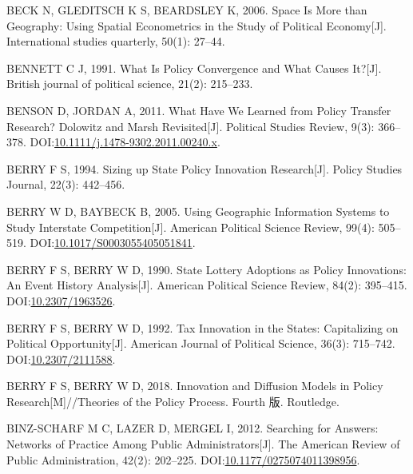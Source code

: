 \documentclass[
  12pt,
]{ctexart}
\newlength{\cslhangindent}
\newlength{\cslentryspacingunit} %
\newenvironment{CSLReferences}[2] %
 {%
  \setlength{\parindent}{0pt}
  \ifodd #1
  \let\oldpar\par
  \def\par{\hangindent=\cslhangindent\oldpar}
  \fi
  \setlength{\parskip}{#2\cslentryspacingunit}
 }%
 {}
\begin{document}
\begin{CSLReferences}{1}{0}
\leavevmode{}%
BECK N, GLEDITSCH K S, BEARDSLEY K, 2006. Space Is More than Geography: {Using} Spatial Econometrics in the Study of Political Economy{[}J{]}. International studies quarterly, 50(1): 27--44.

\leavevmode{}%
BENNETT C J, 1991. What Is Policy Convergence and What Causes It?{[}J{]}. British journal of political science, 21(2): 215--233.

\leavevmode{}%
BENSON D, JORDAN A, 2011. What Have We {Learned} from {Policy Transfer Research}? {Dolowitz} and {Marsh Revisited}{[}J{]}. Political Studies Review, 9(3): 366--378. DOI:\href{https://doi.org/10.1111/j.1478-9302.2011.00240.x}{10.1111/j.1478-9302.2011.00240.x}.

\leavevmode{}%
BERRY F S, 1994. Sizing up {State Policy Innovation Research}{[}J{]}. Policy Studies Journal, 22(3): 442--456.

\leavevmode{}%
BERRY W D, BAYBECK B, 2005. Using {Geographic Information Systems} to {Study Interstate Competition}{[}J{]}. American Political Science Review, 99(4): 505--519. DOI:\href{https://doi.org/10.1017/S0003055405051841}{10.1017/S0003055405051841}.

\leavevmode{}%
BERRY F S, BERRY W D, 1990. State {Lottery Adoptions} as {Policy Innovations}: {An Event History Analysis}{[}J{]}. American Political Science Review, 84(2): 395--415. DOI:\href{https://doi.org/10.2307/1963526}{10.2307/1963526}.

\leavevmode{}%
BERRY F S, BERRY W D, 1992. Tax {Innovation} in the {States}: {Capitalizing} on {Political Opportunity}{[}J{]}. American Journal of Political Science, 36(3): 715--742. DOI:\href{https://doi.org/10.2307/2111588}{10.2307/2111588}.

\leavevmode{}%
BERRY F S, BERRY W D, 2018. Innovation and {Diffusion Models} in {Policy Research}{[}M{]}//Theories of the {Policy Process}. Fourth 版. {Routledge}.

\leavevmode{}%
BINZ-SCHARF M C, LAZER D, MERGEL I, 2012. Searching for {Answers}: {Networks} of {Practice Among Public Administrators}{[}J{]}. The American Review of Public Administration, 42(2): 202--225. DOI:\href{https://doi.org/10.1177/0275074011398956}{10.1177/0275074011398956}.


\end{CSLReferences}
\end{document}
